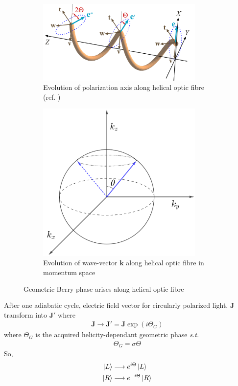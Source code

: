 \documentclass[11pt,a4paper]{article}
\numberwithin{equation}{section}
\begin{document}
\begin{figure}[t]
	\begin{subfigure}[H]{0.62\textwidth}
		\centering
		\includegraphics[width=0.9\textwidth]{berry.png}
		\caption{Evolution of polarization axis along helical optic fibre (ref. \cite{bliokh 09})}
		\label{fig:berry a}
	\end{subfigure}
	\hfil
	\begin{subfigure}[H]{0.35\textwidth}
		\centering
		\includegraphics[width=0.9\textwidth]{poincare-berry.png}
		\caption{Evolution of wave-vector $\boldsymbol{k}$ along helical optic fibre in momentum space}
		\label{fig:berry b}
	\end{subfigure}
	\caption{Geometric Berry phase arises along helical optic fibre}
\end{figure} 

After one adiabatic cycle, electric field vector for circularly polarized light, $\boldsymbol{J}$ transform into $\boldsymbol{J'}$ where
\begin{align}
\boldsymbol{J}\longrightarrow\boldsymbol{J'}=\boldsymbol{J}\exp(i\Theta_G)
\end{align} where $\Theta_G$ is the acquired helicity-dependant geometric phase \textit{s.t.} 
\begin{align}
	\Theta_G= \sigma\Theta
\end{align}
So,
\begin{align}
	\ket{L}&\longrightarrow e^{i\Theta}\ket{L}\\
	\ket{R}&\longrightarrow e^{-i\Theta}\ket{R}
\end{align}
\end{document}
